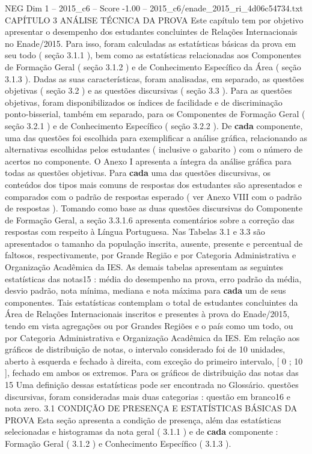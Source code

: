 \begin{textsample}{NEG Dim 1 – 2015\_c6 – Score -1.00 – 2015\_c6/enade\_2015\_ri\_4d06c54734.txt}  \label{ex:f1_neg_287}
CAPÍTULO 3 ANÁLISE TÉCNICA DA PROVA Este capítulo tem por objetivo apresentar o desempenho dos estudantes concluintes de Relações Internacionais no Enade/2015.
Para isso, foram calculadas as estatísticas básicas da prova em seu todo ( seção 3.1.1 ), bem como as estatísticas relacionadas aos Componentes de Formação Geral ( seção 3.1.2 ) e de Conhecimento Específico da Área ( seção 3.1.3 ).
Dadas as suas características, foram analisadas, em separado, as questões objetivas ( seção 3.2 ) e as questões discursivas ( seção 3.3 ).
Para as questões objetivas, foram disponibilizados os índices de facilidade e de discriminação ponto-bisserial, também em separado, para os Componentes de Formação Geral ( seção 3.2.1 ) e de Conhecimento Específico ( seção 3.2.2 ).
De \textbf{cada} componente, uma das questões foi escolhida para exemplificar a análise gráfica, relacionando as alternativas escolhidas pelos estudantes ( inclusive o gabarito ) com o número de acertos no componente.
O Anexo I apresenta a íntegra da análise gráfica para todas as questões objetivas.
Para \textbf{cada} uma das questões discursivas, os conteúdos dos tipos mais comuns de respostas dos estudantes são apresentados e comparados com o padrão de respostas esperado ( ver Anexo VIII com o padrão de respostas ).
Tomando como base as duas questões discursivas do Componente de Formação Geral, a seção 3.3.1.6 apresenta comentários sobre a correção das respostas com respeito à Língua Portuguesa.
Nas Tabelas 3.1 e 3.3 são apresentados o tamanho da população inscrita, ausente, presente e percentual de faltosos, respectivamente, por Grande Região e por Categoria Administrativa e Organização Acadêmica da IES.
As demais tabelas apresentam as seguintes estatísticas das notas15 : média do desempenho na prova, erro padrão da média, desvio padrão, nota mínima, mediana e nota máxima para \textbf{cada} um de seus componentes.
Tais estatísticas contemplam o total de estudantes concluintes da Área de Relações Internacionais inscritos e presentes à prova do Enade/2015, tendo em vista agregações ou por Grandes Regiões e o país como um todo, ou por Categoria Administrativa e Organização Acadêmica da IES.
Em relação aos gráficos de distribuição de notas, o intervalo considerado foi de 10 unidades, aberto à esquerda e fechado à direita, com exceção do primeiro intervalo, [ 0 ; 10 ], fechado em ambos os extremos.
Para os gráficos de distribuição das notas das 15 Uma definição dessas estatísticas pode ser encontrada no Glossário. questões discursivas, foram consideradas mais duas categorias : questão em branco16 e nota zero. 3.1 CONDIÇÃO DE PRESENÇA E ESTATÍSTICAS BÁSICAS DA PROVA Esta seção apresenta a condição de presença, além das estatísticas selecionadas e histogramas da nota geral ( 3.1.1 ) e de \textbf{cada} componente : Formação Geral ( 3.1.2 ) e Conhecimento Específico ( 3.1.3 ).

\end{textsample}
